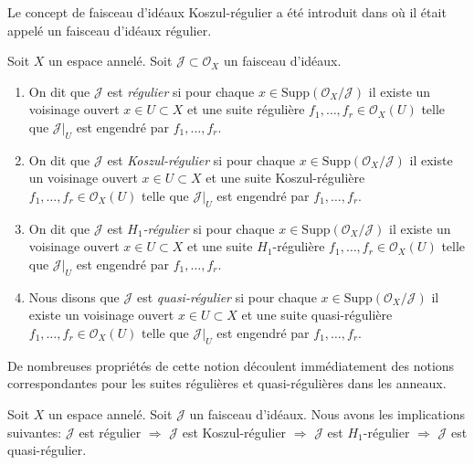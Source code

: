 \begin{definition}
\label{definition-regular-ideal-sheaf}
\begin{reference}
Le concept de faisceau d'idéaux Koszul-régulier a été introduit dans  \cite[Expose VII, Definition 1.4]{SGA6} 
où il était appelé un faisceau d'idéaux régulier.
\end{reference}
Soit  $X$  un espace annelé. Soit  $\mathcal{J} \subset \mathcal{O}_X$  un faisceau d'idéaux.
\begin{enumerate}
\item On dit que  $\mathcal{J}$  est  {\it  régulier}  si pour
chaque  $x \in \text{Supp}(\mathcal{O}_X/\mathcal{J})$  il existe un voisinage ouvert  $x \in U \subset X$  et une suite
régulière  $f_1, \ldots, f_r \in \mathcal{O}_X(U)$  telle que  $\mathcal{J}|_U$  est engendré par  $f_1, \ldots, f_r$.
\item On dit que  $\mathcal{J}$  est  {\it  Koszul-régulier} 
si pour chaque  $x \in \text{Supp}(\mathcal{O}_X/\mathcal{J})$  il existe un voisinage ouvert  $x \in U \subset X$  et une
suite Koszul-régulière  $f_1, \ldots, f_r \in \mathcal{O}_X(U)$  telle que  $\mathcal{J}|_U$  est engendré par
 $f_1, \ldots, f_r$.
\item On dit que  $\mathcal{J}$  est  {\it 
 $H_1$-régulier}  si pour chaque  $x \in \text{Supp}(\mathcal{O}_X/\mathcal{J})$  il existe un
voisinage ouvert  $x \in U \subset X$  et une suite  $H_1$-régulière  $f_1, \ldots, f_r \in \mathcal{O}_X(U)$ 
telle que  $\mathcal{J}|_U$  est engendré par  $f_1, \ldots, f_r$.
\item Nous disons que  $\mathcal{J}$  est  {\it 
quasi-régulier}  si pour chaque  $x \in \text{Supp}(\mathcal{O}_X/\mathcal{J})$  il existe un voisinage
ouvert  $x \in U \subset X$  et une suite quasi-régulière  $f_1, \ldots, f_r \in \mathcal{O}_X(U)$  telle que
 $\mathcal{J}|_U$  est engendré par  $f_1, \ldots, f_r$.
\end{enumerate}
\end{definition}

\noindent
De nombreuses propriétés de cette notion découlent immédiatement des notions
correspondantes pour les suites régulières et quasi-régulières dans les anneaux.

\begin{lemma}
\label{lemma-regular-quasi-regular-scheme}
Soit  $X$  un espace annelé. Soit  $\mathcal{J}$  un faisceau d'idéaux. Nous
avons les implications suivantes:  $\mathcal{J}$  est régulier  $\Rightarrow$ 
 $\mathcal{J}$  est Koszul-régulier  $\Rightarrow$   $\mathcal{J}$  est
 $H_1$-régulier  $\Rightarrow$   $\mathcal{J}$  est quasi-régulier.
\end{lemma}

